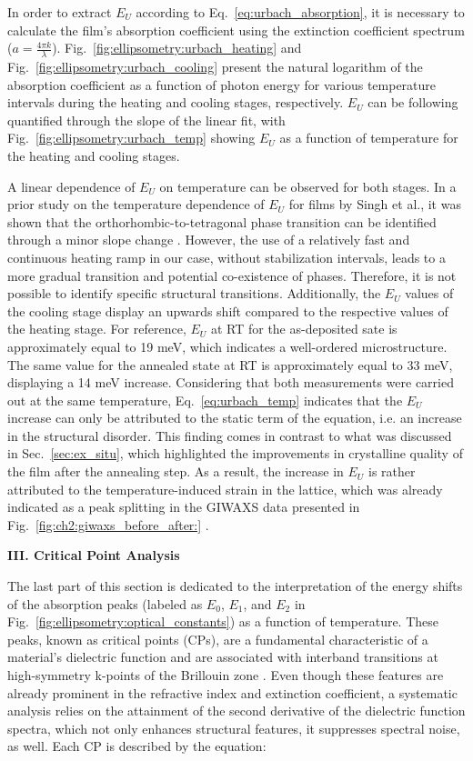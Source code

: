 In order to extract $E_U$ according to Eq.~\ref{eq:urbach_absorption}, it is necessary to calculate the film's absorption coefficient using the extinction coefficient spectrum ($a = \frac{4\pi k}{\lambda}$). Fig.~\ref{fig:ellipsometry:urbach_heating} and Fig.~\ref{fig:ellipsometry:urbach_cooling} present the natural logarithm of the absorption coefficient as a function of photon energy for various temperature intervals during the heating and cooling stages, respectively. $E_U$ can be following quantified through the slope of the linear fit, with Fig.~\ref{fig:ellipsometry:urbach_temp} showing $E_U$ as a function of temperature for the heating and cooling stages. 

A linear dependence of $E_U$ on temperature can be observed for both stages. In a prior study on the temperature dependence of $E_U$ for  films by Singh et al., it was shown that the orthorhombic-to-tetragonal phase transition can be identified through a minor slope change \cite{Singh2016EffectCHsub3/subNHsub3/subPbIsub3/sub}. However, the use of a relatively fast and continuous heating ramp in our case, without stabilization intervals, leads to a more gradual transition and potential co-existence of phases. Therefore, it is not possible to identify specific structural transitions. Additionally, the $E_U$ values of the cooling stage display an upwards shift compared to the respective values of the heating stage. For reference, $E_U$ at RT for the as-deposited sate is approximately equal to 19 meV, which indicates a well-ordered microstructure. The same value for the annealed state at RT is approximately equal to 33 meV, displaying a 14 meV increase. Considering that both measurements were carried out at the same temperature, Eq.~\ref{eq:urbach_temp} indicates that the $E_U$ increase can only be attributed to the static term of the equation, i.e. an increase in the structural disorder. This finding comes in contrast to what was discussed in Sec.~\ref{sec:ex_situ}, which highlighted the improvements in crystalline quality of the film after the annealing step. As a result, the increase in $E_U$ is rather attributed to the temperature-induced strain in the lattice, which was already indicated as a peak splitting in the GIWAXS data presented in Fig.~\ref{fig:ch2:giwaxs_before_after:} \cite{Kim2020ImpactCells}. 



\textbf{III. Critical Point Analysis}


The last part of this section is dedicated to the interpretation of the energy shifts of the absorption peaks (labeled as $E_0$, $E_1$, and $E_2$ in Fig.~\ref{fig:ellipsometry:optical_constants}) as a function of temperature. These peaks, known as critical points (CPs), are a fundamental characteristic of a material's dielectric function and are associated with interband transitions at high-symmetry k-points of the Brillouin zone \cite{Aspnes1983DielectricEV}. Even though these features are already prominent in the refractive index and extinction coefficient, a systematic analysis relies on the attainment of the second derivative of the dielectric function spectra, which not only enhances structural features, it suppresses spectral noise, as well. Each CP is described by the equation: 

